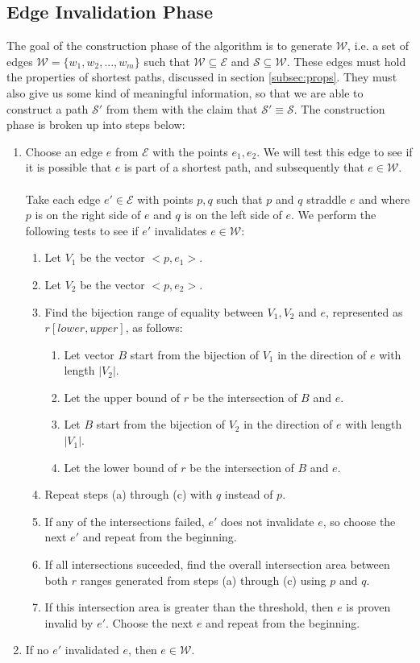 \documentclass[12pt]{article}
\begin{document}
\subsection{Edge Invalidation Phase}\label{subsec:edge-gen}
The goal of the construction phase of the algorithm is to generate $\mathcal{W}$,
i.e. a set of
edges $\mathcal{W} = \{w_1, w_2, ..., w_m\}$ such that
$\mathcal{W} \subseteq \mathcal{E}$ and $\mathcal{S} \subseteq \mathcal{W}$.
These edges must hold the properties of shortest paths, discussed in section
\ref{subsec:props}.
They must also give us some kind of meaningful information, so that we are able to
construct a path $\mathcal{S}'$ from them with the claim that
$\mathcal{S}' \equiv \mathcal{S}$.
The construction phase is broken up into steps below:
\begin{enumerate}
\item Choose an edge $e$ from $\mathcal{E}$ with the points $e_1,e_2$.
We will test this edge to see if it is possible that $e$ is part of a shortest path,
and subsequently that $e \in \mathcal{W}$.
\\\\
Take each edge $e' \in \mathcal{E}$ with points $p,q$ such that $p$ and $q$ straddle
$e$ and where $p$ is on the right side
of $e$ and $q$ is on the left side of $e$.
We perform the following tests to see if $e'$ invalidates $e \in \mathcal{W}$:
\begin{enumerate}
\item Let $V_1$ be the vector $<p,e_1>$.
\item Let $V_2$ be the vector $<p,e_2>$.
\item Find the bijection range of equality between $V_1,V_2$ and $e$,
represented as $r[lower, upper]$, as follows:
\begin{enumerate}
\item Let vector $B$ start from the bijection of $V_1$
in the direction of $e$ with length $|V_2|$.
\item Let the upper bound of $r$ be the intersection of $B$ and $e$.
\item Let $B$ start from the bijection of $V_2$
in the direction of $e$ with length $|V_1|$.
\item Let the lower bound of $r$ be the intersection of $B$ and $e$.
\end{enumerate}
\item Repeat steps (a) through (c) with $q$ instead of $p$.
\item If any of the intersections failed, $e'$ does not invalidate $e$,
so choose the next $e'$ and repeat from the beginning.
\item If all intersections suceeded, find the overall intersection area between
both $r$ ranges generated from steps (a) through (c) using $p$ and $q$.
\item If this intersection area is greater than the threshold, then $e$ is proven
invalid by $e'$. Choose the next $e$ and repeat from the beginning.
\end{enumerate}
\item If no $e'$ invalidated $e$, then $e \in \mathcal{W}$.
\end{enumerate}
\end{document}
